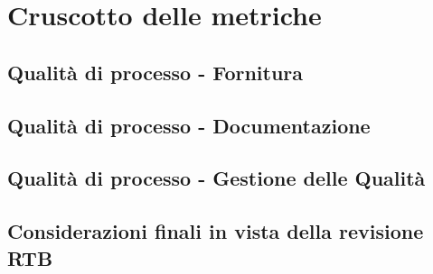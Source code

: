 \section{Cruscotto delle metriche}
\subsection{Qualità di processo - Fornitura}
\subsection{Qualità di processo - Documentazione}
\subsection{Qualità di processo - Gestione delle Qualità}
\subsection{Considerazioni finali in vista della revisione RTB}